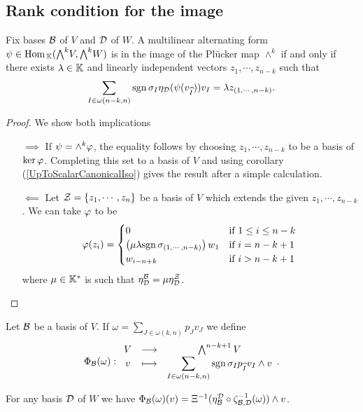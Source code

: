 \subsection{Rank condition for the image}
\begin{lemma}\label{DecomposabilityOfMultilinearForm}
Fix bases $\mathcal{B}$ of $V$ and $\mathcal{D}$ of $W$. 
A multilinear alternating form $\psi\in \Hom_\K(\bw V,\bw W)$ is in the image of the Pl\"ucker map $\wedge^k$ if and only if there exists $\lambda\in\mathbb{K}$ and linearly independent vectors $z_1,\cdots,z_{n-k}$ such that
\[\sum_{I\in \omega(n-k,n)}\mathrm{sgn}\,\sigma_I\eta_{\mathcal{D}}(\psi(v_{\widehat{I}}))v_I=\lambda z_{(1,\cdots, n-k)}.\]
\end{lemma}
\begin{proof}
We show both implications
\setlength{\leftmargini}{0cm}
\begin{itemize}
\item[$\boxed{\implies}$] If $\psi=\wedge^k\varphi$, the equality follows by choosing $z_1,\cdots, z_{n-k}$ to be a basis of $\ker\varphi$. Completing this set to a basis of $V$ and using corollary (\ref{UpToScalarCanonicalIso}) gives the result after a simple calculation.
\item[$\boxed{\impliedby}$] Let $\mathcal{Z}=\left\{{z_1,\cdots, z_n}\right\}$ be a basis of $V$ which extends the given $z_1,\cdots, z_{n-k}$. We can take $\varphi$ to be
\[\varphi(z_i)=\begin{cases}
0 & \text{if }1\leq i\leq n-k\\
\left({\mu\lambda\mathrm{sgn}\,\sigma_{(1,\cdots,n-k)}}\right) w_1 & \text{if }i=n-k+1\\
w_{i-n+k} & \text{if }i>n-k+1
\end{cases}\]
where $\mu\in\mathbb{K}^\ast$ is such that $\eta^{\mathcal{B}}_{\mathcal{D}}=\mu \eta^{\mathcal{Z}}_{\mathcal{D}}$.
\end{itemize}
\setlength{\leftmargini}{0.5cm}
\end{proof}

\begin{definition}
Let $\mathcal{B}$ be a basis of $V$. If $\omega=\sum_{J\in\omega(k,n)}p_J v_J$ we define
\[\Phi_{\mathcal{B}}(\omega):\begin{array}{ccc} {V} & \longrightarrow & {\bigwedge^{n-k+1}V}\\ {v} & \longmapsto & {\displaystyle\sum_{I\in \omega(n-k,n)}\mathrm{sgn}\,\sigma_I p_{\widehat{I}}v_I\wedge v} \end{array}.\]
\end{definition}

\begin{remark}
For any basis $\mathcal{D}$ of $W$ we have $\Phi_{\mathcal{B}}(\omega)(v)=\Xi^{-1}(\eta^{\mathcal{D}}_{\mathcal{B}}\circ \zeta_{\mathcal{B},\mathcal{D}}^{-1}(\omega))\wedge v$.
\end{remark}

